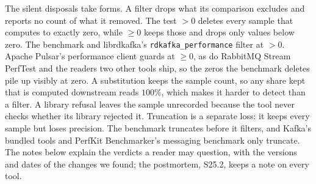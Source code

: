 \documentclass[10pt,journal,onecolumn]{IEEEtran}
\newcommand{\kafka}{Kafka}
\begin{document}
The \harnessSilentWord{} silent disposals take \harnessDisposalClassesWord{} forms. A filter drops
what its comparison excludes and reports no count of what it removed. The test $>0$ deletes every
sample that computes to exactly zero, while $\geq 0$ keeps those and drops only values below zero.
The benchmark and librdkafka's \texttt{rdkafka\_performance} filter at $>0$.
Apache Pulsar's performance client guards at $\geq 0$, as do RabbitMQ Stream PerfTest and the
readers two other tools ship, so the zeros the benchmark deletes pile up visibly at zero. A
substitution keeps the sample count, so any share kept that is computed downstream reads $100\%$, which
makes it harder to detect than a filter. A library refusal leaves the sample unrecorded because
the tool never checks whether its library rejected it. Truncation is a separate loss: it keeps
every sample but loses precision. The benchmark truncates before it filters, and \kafka{}'s
bundled tools and PerfKit Benchmarker's messaging benchmark only truncate. The notes below explain
the verdicts a reader may question, with the versions and dates of the changes we found; the
postmortem, S25.2, keeps a note on every tool.
\end{document}
